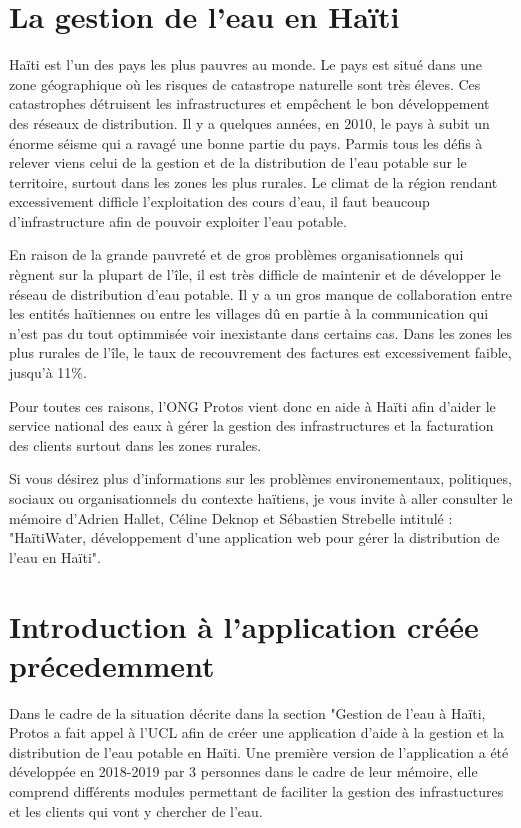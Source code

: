 \documentclass{EPL-master-thesis-covers-FR}
\begin{document}
		\section{La gestion de l'eau en Haïti}
			\label{sec:situation}
			
				Haïti est l'un des pays les plus pauvres au monde. Le pays est situé dans une zone géographique où les risques de catastrope naturelle sont très éleves. Ces catastrophes détruisent les infrastructures et empêchent le bon développement des réseaux de distribution. Il y a quelques années, en 2010, le pays à subit un énorme séisme qui a ravagé une bonne partie du pays. Parmis tous les défis à relever viens celui de la gestion et de la distribution de l'eau potable sur le territoire, surtout dans les zones les plus rurales. Le climat de la région rendant excessivement difficle l'exploitation des cours d'eau, il faut beaucoup d'infrastructure afin de pouvoir exploiter l'eau potable.
				
				En raison de la grande pauvreté et de gros problèmes organisationnels qui règnent sur la plupart de l'île, il est très difficle de maintenir et de développer le réseau de distribution d'eau potable. Il y a un gros manque de collaboration entre les entités haïtiennes ou entre les villages dû en partie à la communication qui n'est pas du tout optimmisée voir inexistante dans certains cas. Dans les zones les plus rurales de l'île, le taux de recouvrement des factures est excessivement faible, jusqu'à 11\%.
				
				Pour toutes ces raisons, l'ONG Protos vient donc en aide à Haïti afin d'aider le service national des eaux à gérer la gestion des infrastructures et la facturation des clients surtout dans les zones rurales.
				
				Si vous désirez plus d'informations sur les problèmes environementaux, politiques, sociaux ou organisationnels du contexte haïtiens, je vous invite à aller consulter le mémoire d'Adrien Hallet, Céline Deknop et Sébastien Strebelle intitulé :
				"HaïtiWater, développement d'une application web pour gérer la distribution de l'eau en Haïti".



		\section{Introduction à l'application créée précedemment}
				Dans le cadre de la situation décrite dans la section "Gestion de l'eau à Haïti, Protos a fait appel à l'UCL afin de créer une application d'aide à la gestion et la distribution de l'eau potable en Haïti. Une première version de l'application a été développée en 2018-2019 par 3 personnes dans le cadre de leur mémoire, elle comprend différents modules permettant de faciliter la gestion des infrastuctures et les clients qui vont y chercher de l'eau.
				
\end{document}
